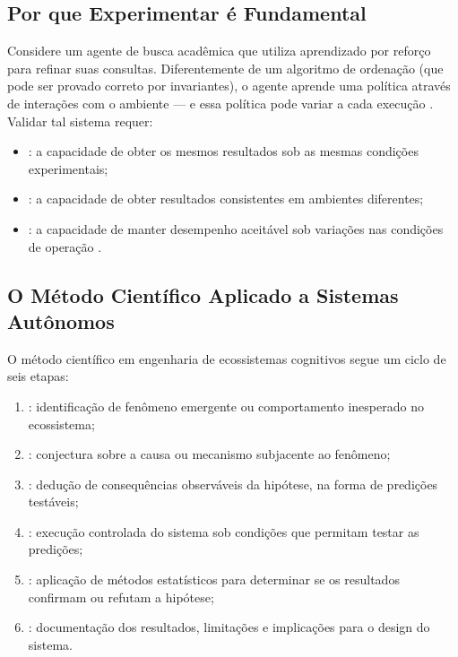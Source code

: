 \subsection{Por que Experimentar é Fundamental}

Considere um agente de busca acadêmica que utiliza aprendizado por
reforço para refinar suas consultas. Diferentemente de um algoritmo
de ordenação (que pode ser provado correto por invariantes), o agente
aprende uma política através de interações com o ambiente — e essa
política pode variar a cada execução \cite{sutton2018reinforcement}.
Validar tal sistema requer:
\begin{itemize}
\item {}: a capacidade de obter os mesmos
resultados sob as mesmas condições experimentais;
\item {}: a capacidade de obter resultados
consistentes em ambientes diferentes;
\item {}: a capacidade de manter desempenho aceitável
sob variações nas condições de operação \cite{gundersen2018reproducibility,
goodman2016what}.
\end{itemize}

\subsection{O Método Científico Aplicado a Sistemas Autônomos}

O método científico em engenharia de ecossistemas cognitivos segue
um ciclo de seis etapas:

\begin{enumerate}
\item {}: identificação de fenômeno emergente ou
comportamento inesperado no ecossistema;
\item {}: conjectura sobre a causa ou
mecanismo subjacente ao fenômeno;
\item {}: dedução de consequências observáveis da
hipótese, na forma de predições testáveis;
\item {}: execução controlada do sistema sob
condições que permitam testar as predições;
\item {}: aplicação de métodos estatísticos para
determinar se os resultados confirmam ou refutam a hipótese;
\item {}: documentação dos resultados, limitações
e implicações para o design do sistema.
\end{enumerate}

